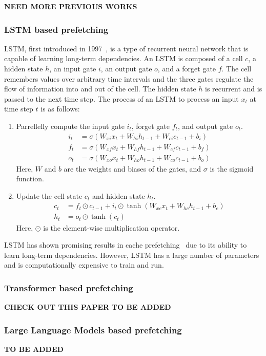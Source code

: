\textbf{NEED MORE PREVIOUS WORKS}

\subsubsection{LSTM based prefetching}

LSTM, first introduced in 1997~\cite{LSTM}, is a type of recurrent neural network that is capable of learning long-term dependencies. An LSTM is composed of a cell $c$, a hidden state $h$, an input gate $i$, an output gate $o$, and a forget gate $f$. The cell remembers values over arbitrary time intervals and the three gates regulate the flow of information into and out of the cell. The hidden state $h$ is recurrent and is passed to the next time step. The process of an LSTM to process an input $x_t$ at time step $t$ is as follows:

\begin{enumerate}
    \item Parrellelly compute the input gate $i_t$, forget gate $f_t$, and output gate $o_t$.\begin{align*}
        i_t &= \sigma(W_{xi}x_t + W_{hi}h_{t-1} + W_{ci}c_{t-1} + b_i)\\
        f_t &= \sigma(W_{xf}x_t + W_{hf}h_{t-1} + W_{cf}c_{t-1} + b_f)\\
        o_t &= \sigma(W_{xo}x_t + W_{ho}h_{t-1} + W_{co}c_{t-1} + b_o)
    \end{align*}
    Here, $W$ and $b$ are the weights and biases of the gates, and $\sigma$ is the sigmoid function.
    \item Update the cell state $c_t$ and hidden state $h_t$.\begin{align*}
        c_t &= f_t \odot c_{t-1} + i_t \odot \tanh(W_{xc}x_t + W_{hc}h_{t-1} + b_c)\\
        h_t &= o_t \odot \tanh(c_t)
    \end{align*}
    Here, $\odot$ is the element-wise multiplication operator.
\end{enumerate}

LSTM has shown promising results in cache prefetching~\cite{LMAP} due to its ability to learn long-term dependencies. However, LSTM has a large number of parameters and is computationally expensive to train and run.

\subsubsection{Transformer based prefetching}

\textbf{CHECK OUT THIS PAPER}
\cite{Twilight}
\textbf{TO BE ADDED}

\subsubsection{Large Language Models based prefetching}

\textbf{TO BE ADDED}